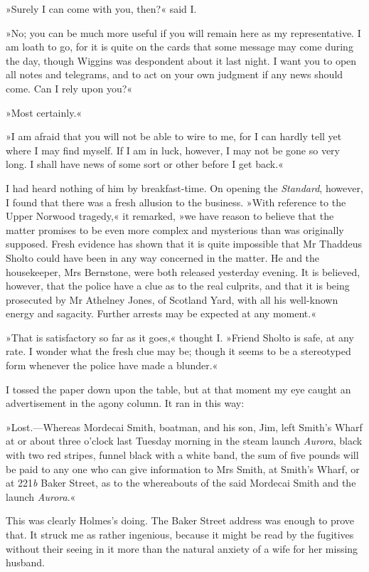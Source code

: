 »Surely I can come with you, then?« said I.

»No; you can be much more useful if you will remain here as my representative. I am loath to go, for it is quite on the cards that some message may come during the day, though Wiggins was despondent about it last night. I want you to open all notes and telegrams, and to act on your own judgment if any news should come. Can I rely upon you?«

»Most certainly.«

»I am afraid that you will not be able to wire to me, for I can hardly tell yet where I may find myself. If I am in luck, however, I may not be gone so very long. I shall have news of some sort or other before I get back.«

I had heard nothing of him by breakfast-time. On opening the \textit{Standard}, however, I found that there was a fresh allusion to the business. »With reference to the Upper Norwood tragedy,« it remarked, »we have reason to believe that the matter promises to be even more complex and mysterious than was originally supposed. Fresh evidence has shown that it is quite impossible that Mr Thaddeus Sholto could have been in any way concerned in the matter. He and the housekeeper, Mrs Bernstone, were both released yesterday evening. It is believed, however, that the police have a clue as to the real culprits, and that it is being prosecuted by Mr Athelney Jones, of Scotland Yard, with all his well-known energy and sagacity. Further arrests may be expected at any moment.«

»That is satisfactory so far as it goes,« thought I. »Friend Sholto is safe, at any rate. I wonder what the fresh clue may be; though it seems to be a stereotyped form whenever the police have made a blunder.«

I tossed the paper down upon the table, but at that moment my eye caught an advertisement in the agony column. It ran in this way:

»Lost.—Whereas Mordecai Smith, boatman, and his son, Jim, left Smith's Wharf at or about three o'clock last Tuesday morning in the steam launch \textit{Aurora}, black with two red stripes, funnel black with a white band, the sum of five pounds will be paid to any one who can give information to Mrs Smith, at Smith's Wharf, or at 221\textit{b} Baker Street, as to the whereabouts of the said Mordecai Smith and the launch \textit{Aurora}.«

This was clearly Holmes's doing. The Baker Street address was enough to prove that. It struck me as rather ingenious, because it might be read by the fugitives without their seeing in it more than the natural anxiety of a wife for her missing husband.

